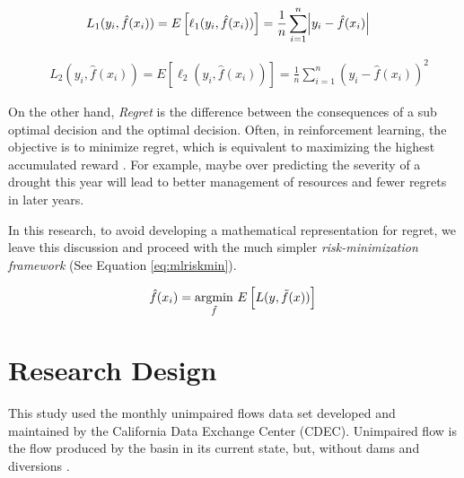 \begin{equation} \label{eq:l1risk}
	\begin{aligned}
		& L_1(y_i,\hat{f}(x_i)) = E\left[\ell_1(y_i, \hat{f}(x_i))\right] = \frac{1}{n} \sum_{i=1}^{n} \abs{y_i-\hat{f}(x_i)}
	\end{aligned}
\end{equation}
	
\begin{equation} \label{eq:l2risk}
	\begin{aligned}
		& L_2(y_i,\hat{f}(x_i)) = E\left[\ell_2(y_i, \hat{f}(x_i))\right] = \frac{1}{n} \sum_{i=1}^{n} {(y_i-\hat{f}(x_i))^2}
	\end{aligned}
\end{equation}

On the other hand, \textit{Regret} is the difference between the consequences of a sub optimal decision and the optimal decision. Often, in reinforcement learning, the objective is to minimize regret, which is equivalent to maximizing the highest accumulated reward \cite{sutton2018reinforcement}. For example, maybe over predicting the severity of a drought this year will lead to better management of resources and fewer regrets in later years.

In this research, to avoid developing a mathematical representation for regret, we leave this discussion and proceed with the much simpler \textit{risk-minimization framework} (See Equation \ref{eq:mlriskmin}). 

\begin{equation} \label{eq:mlriskmin}
	\hat{f}(x_i) = \underset{\tilde{f}}{\mathrm{argmin}} \ E\left[L(y, \tilde{f}(x))\right] \\
\end{equation}
\section{Research Design} \label{ch4:design}
This study used the monthly unimpaired flows data set developed and maintained by the California Data Exchange Center (CDEC). Unimpaired flow is the flow produced by the basin in its current state, but, without dams and diversions \cite{cadwruf2016}. 

